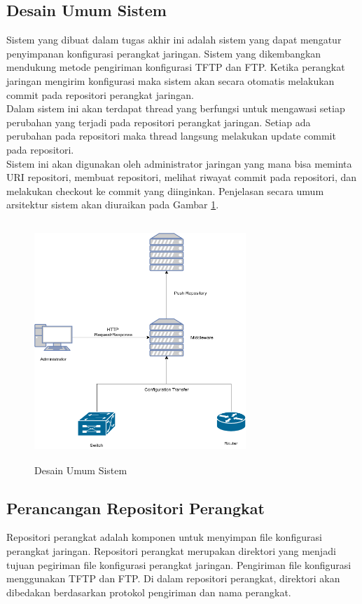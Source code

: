 		\subsection{Desain Umum Sistem}
			Sistem yang dibuat dalam tugas akhir ini adalah sistem yang dapat mengatur penyimpanan konfigurasi perangkat jaringan. Sistem yang dikembangkan mendukung metode pengiriman konfigurasi TFTP dan FTP. Ketika perangkat jaringan mengirim konfigurasi maka sistem akan secara otomatis melakukan commit pada repositori perangkat jaringan.\\
			\indent Dalam sistem ini akan terdapat thread yang berfungsi untuk mengawasi setiap perubahan yang terjadi pada repositori perangkat jaringan. Setiap ada perubahan pada repositori maka thread langsung melakukan update commit pada repositori.\\
			\indent Sistem ini akan digunakan oleh administrator jaringan yang mana bisa meminta URI repositori, membuat repositori, melihat riwayat commit pada repositori, dan melakukan checkout ke commit yang diinginkan. Penjelasan secara umum arsitektur sistem akan diuraikan pada Gambar \ref{DesainUmumSistem}.\\
                \begin{figure}[H]
                    \centering
                    \includegraphics[width=8cm,height=9cm]{Images/C-3/DesainUmumTA.png}
                    \caption{Desain Umum Sistem}
                    \label{DesainUmumSistem}
                \end{figure}
                
		\subsection{Perancangan Repositori Perangkat }
			Repositori perangkat adalah komponen untuk menyimpan file konfigurasi perangkat jaringan. Repositori perangkat merupakan direktori yang menjadi tujuan pegiriman file konfigurasi perangkat jaringan. Pengiriman file konfigurasi menggunakan TFTP dan FTP. Di dalam repositori perangkat, direktori akan dibedakan berdasarkan protokol pengiriman dan nama perangkat.\\ 

